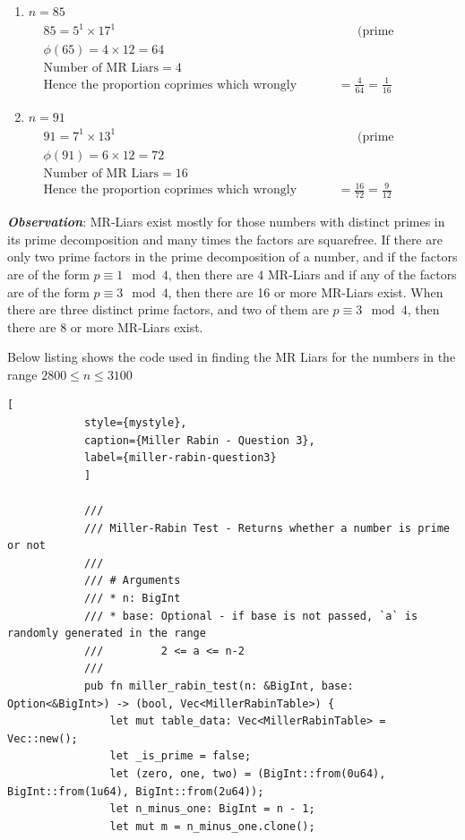 \documentclass[11pt,a4paper]{article}
\begin{document}
\begin{enumerate}[1.]
\begin{flushleft}
\begin{enumerate}[1.]
				\item $n = 85$
				\begin{align}
					& 85 = 5^1 \times 17^1 &&\text{(prime factorisation)}\nonumber\\
					& \phi(65) = 4 \times 12 = 64 \nonumber\\
					& \text{Number of MR Liars} = 4\nonumber\\
					& \text{Hence the proportion coprimes which wrongly declares 85 as prime} = \frac{4}{64} = \frac{1}{16} \nonumber
				\end{align}

				\item $n = 91$
				\begin{align}
					& 91 = 7^1 \times 13^1 &&\text{(prime factorisation)}\nonumber\\
					& \phi(91) = 6 \times 12 = 72 \nonumber\\
					& \text{Number of MR Liars} = 16\nonumber\\
					& \text{Hence the proportion coprimes which wrongly declares 85 as prime} = \frac{16}{72} = \frac{9}{12} \nonumber
				\end{align}
			\end{enumerate}

			\textbf{\textit{Observation}}: MR-Liars exist mostly for those numbers with distinct primes in its prime decomposition and many times the factors are squarefree. If there are only two prime factors in the prime decomposition of a number, and if the factors are of the form $p \equiv 1\mod4$, then there are $4$ MR-Liars and if any of the factors are of the form $p \equiv 3\mod4$, then there are 16 or more MR-Liars exist. When there are three distinct prime factors, and two of them are $p \equiv 3 \mod 4$, then there are $8$ or more MR-Liars exist.
		\end{flushleft}

		\medskip
		Below listing shows the code used in finding the MR Liars for the numbers in the range $2800 \le n \le 3100$

		\begin{lstlisting}[
			style={mystyle},
			caption={Miller Rabin - Question 3},
			label={miller-rabin-question3}
			]

			///
			/// Miller-Rabin Test - Returns whether a number is prime or not
			///
			/// # Arguments
			/// * n: BigInt
			/// * base: Optional - if base is not passed, `a` is randomly generated in the range
			///         2 <= a <= n-2
			///
			pub fn miller_rabin_test(n: &BigInt, base: Option<&BigInt>) -> (bool, Vec<MillerRabinTable>) {
				let mut table_data: Vec<MillerRabinTable> = Vec::new();
				let _is_prime = false;
				let (zero, one, two) = (BigInt::from(0u64), BigInt::from(1u64), BigInt::from(2u64));
				let n_minus_one: BigInt = n - 1;
				let mut m = n_minus_one.clone();


\end{lstlisting}
\end{enumerate}
\end{document}
